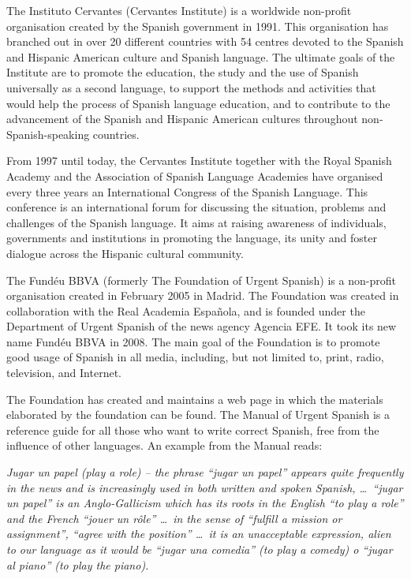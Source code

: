 \begin{multicols}{2}
 
The Instituto Cervantes (Cervantes Institute) is a worldwide non-profit organisation created by the Spanish government in 1991. This organisation has branched out in over 20 different countries with 54 centres devoted to the Spanish and Hispanic American culture and Spanish language. The ultimate goals of the Institute are to promote the education, the study and the use of Spanish universally as a second language, to support the methods and activities that would help the process of Spanish language education, and to contribute to the advancement of the Spanish and Hispanic American cultures throughout non-Spanish-speaking countries.

From 1997 until today, the Cervantes Institute together with the Royal Spanish Academy and the Association of Spanish Language Academies have organised every three years an International Congress of the Spanish Language. This conference is an international forum for discussing the situation, problems and challenges of the Spanish language. It aims at raising awareness of individuals, governments and institutions in promoting the language, its unity and foster dialogue across the Hispanic cultural community.

The Fundéu BBVA (formerly The Foundation of Urgent Spanish) \cite{fundeu} is a non-profit organisation created in February 2005 in Madrid. The Foundation was created in collaboration with the Real Academia Española, and is founded under the Department of Urgent Spanish of the news agency Agencia EFE. It took its new name Fundéu BBVA in 2008. The main goal of the Foundation is to promote good usage of Spanish in all media, including, but not limited to, print, radio, television, and Internet.


The Foundation has created and maintains a web page in which the materials elaborated by the foundation can be found. The Manual of Urgent Spanish is a reference guide for all those who want to write correct Spanish, free from the influence of other languages. An example from the Manual reads:

\textit{Jugar un papel (play a role) -- the phrase “jugar un papel” appears quite frequently in the news and is increasingly used in both written and spoken Spanish, \dots\ “jugar un papel” is an Anglo-Gallicism which has its roots in the English ``to play a role'' and the French ``jouer un rôle'' \dots\ in the sense of ``fulfill a mission or assignment'', ``agree with the position'' \dots\ it is an unacceptable expression, alien to our language as it would be “jugar una comedia” (to play a comedy) o “jugar al piano” (to play the piano).}


\end{multicols}
